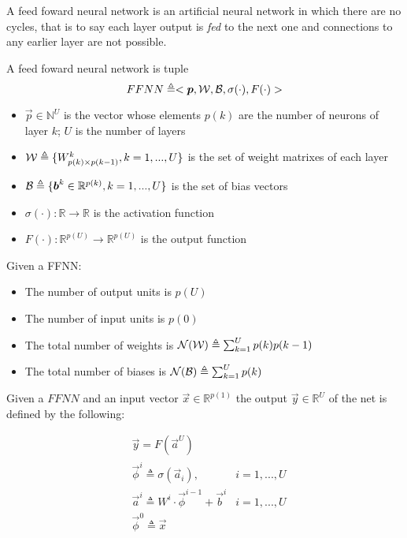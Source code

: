 
A feed foward neural network is an artificial neural network in which there are no cycles, that is to say each layer output is \textit{fed} to the next one and connections to any earlier layer are not possible. 


\begin{defn}
\label{def_ffnn}
A feed foward neural network is tuple
$$FFNN\triangleq<\boldsymbol{p},\mathcal{W},\mathcal{B},\sigma(\cdot),F(\cdot)>$$
\begin{itemize}
 \item $\vec{p} \in \mathbb{N}^U$ is the vector whose elements $p(k)$ are the number of neurons of layer $k$; $U$ is the number of layers
 \item $\mathcal{W} \triangleq \{W^k_{p(k) \times p(k-1)}, k=1,...,U \}$ is the set of weight matrixes of each layer
 \item $\mathcal{B} \triangleq \{\boldsymbol{b}^k \in \mathbb{R}^{p(k)}, k=1,...,U \} $ is the set of bias vectors
 \item $\sigma(\cdot): \mathbb{R}\rightarrow \mathbb{R}$ is the activation function
 \item $F(\cdot): \mathbb{R}^{p(U)}\rightarrow \mathbb{R}^{p(U)}$ is the output function
\end{itemize}
\end{defn}

\begin{remark}{}
Given a FFNN:
\begin{itemize}
 \item The number of output units is $p(U)$
 \item The number of input units is $p(0)$
 \item The total number of weights is $\mathcal{N}(\mathcal{W}) \triangleq \sum_{k=1}^U p(k)p(k-1)$
 \item The total number of biases is $\mathcal{N}(\mathcal{B}) \triangleq \sum_{k=1}^U p(k)$
\end{itemize}
\end{remark}

\begin{defn}
Given a $FFNN$ and an input vector $\vec{x} \in \mathbb{R}^{p(1)}$ the output $\vec{y} \in \mathbb{R}^U$ of the net is defined by the following:

\begin{align}
&\vec{y}=F(\vec{a}^{U}) &\\
&\vec{\phi}^{i} \triangleq \sigma(\vec{a}_{i}), & i=1,...,U\\
&\vec{a}^{i} \triangleq W^{i} \cdot \vec{\phi}^{i-1} +\vec{b}^i  & i=1,...,U\\
&\vec{\phi}^{0} \triangleq \vec{x} &
\end{align}
\end{defn}

